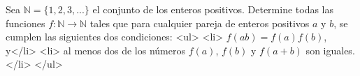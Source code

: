 Sea $\mathbb N = \{1, 2, 3, . . .\}$ el conjunto de los enteros positivos. Determine todas las funciones $f : \mathbb N \to \mathbb N$ tales que para cualquier pareja de enteros positivos $a$ y $b$, se cumplen las siguientes dos condiciones:
<ul>
<li> $f(ab) = f(a)f(b)$, y</li>
<li> al menos dos de los números $f(a)$, $f(b)$ y $f(a + b)$ son iguales.</li>
</ul>